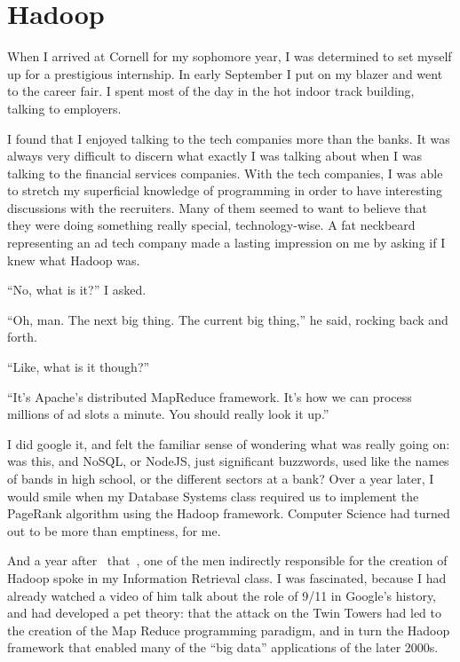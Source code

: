 \documentclass[12pt]{article}
\begin{document}
\section{Hadoop}
When I arrived at Cornell for my sophomore year, I was determined to set
myself up for a prestigious internship.  In early September I put on my
blazer and went to the career fair.  I spent most of the day in the
hot indoor track building, talking to employers. 

I found that I enjoyed talking to the tech companies more than the
banks.  It was always very difficult to discern what exactly I was
talking about when I was talking to the financial services companies.
With the tech companies, I was able to stretch my superficial knowledge
of programming in order to have interesting discussions with the
recruiters.  Many of them seemed to want to believe that they were doing
something really special, technology-wise.  A fat neckbeard representing
an ad tech company made a lasting impression on me by asking if I knew
what Hadoop was.  

``No, what is it?'' I asked.

``Oh, man.  The next big thing.  The current big thing,'' he said,
rocking back and forth.

``Like, what is it though?''

``It's Apache's distributed MapReduce framework.  It's how we can process
millions of ad slots a minute.  You should really look it up.''

I did google it, and felt the familiar sense of wondering what was
really going on: was this, and NoSQL, or NodeJS, just significant
buzzwords, used like the names of bands in high school, or the different
sectors at a bank?   Over a year later, I would smile when my
Database Systems class required us to implement the PageRank algorithm
using the Hadoop framework.  Computer Science had turned out to be more
than emptiness, for me.

And a year after ~that~, one of the men indirectly responsible for the
creation of Hadoop spoke in my Information Retrieval class.  I was
fascinated, because I had already watched a video of him talk about the
role of 9/11 in Google's history, and had developed a pet theory: that
the attack on the Twin Towers had led to the creation of the Map Reduce
programming paradigm, and in turn the Hadoop framework that enabled many
of the ``big data'' applications of the later 2000s.
\end{document}
